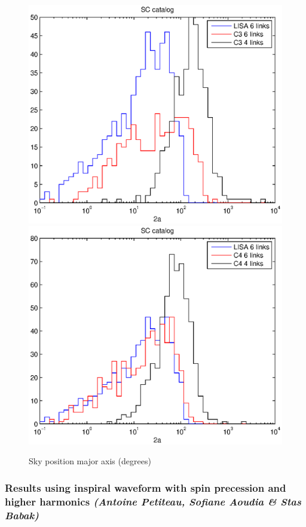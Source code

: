 \documentclass{iopart}
\begin{document}
\begin{figure}[H]
\includegraphics[scale=0.54]{FigSMBHRyanNeil/SC2a3.eps}
\includegraphics[scale=0.54]{FigSMBHRyanNeil/SC2a4.eps}
\caption{Sky position major axis (degrees)}
\end{figure}


\subsubsection{Results using inspiral waveform with spin precession and higher harmonics  {\it (Antoine Petiteau, Sofiane Aoudia \& Stas Babak)}}
\label{SSS:MBHbPEInspAEI}
\end{document}
